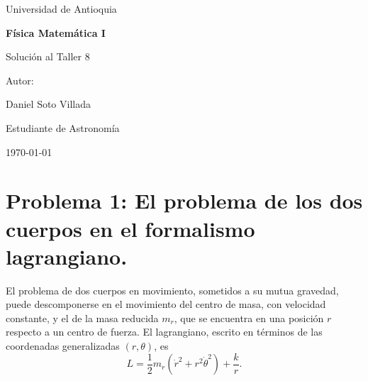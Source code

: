 \documentclass[a4paper]{article}
\begin{document}
\begin{titlepage}
  \centering
  {\Large Universidad de Antioquia\par}
  \vspace{2cm}
  {\huge\bfseries Física Matemática I\par}
  \vspace{0.4cm}
  {\Large Solución al Taller 8 \par}
  \vspace{2.5cm}
  {\large Autor:\par}
  \vspace{0.2cm}
  {\large Daniel Soto Villada\par}
  {\large Estudiante de Astronomía\par}
  \vfill
  {\large \today\par}
\end{titlepage}

\newpage
\tableofcontents
\newpage


\section{Problema 1: El problema de los dos cuerpos en el formalismo lagrangiano.}

El problema de dos cuerpos en movimiento, sometidos a su mutua gravedad, puede descomponerse en el movimiento del centro de masa, con velocidad constante, y el de la masa reducida $m_r$, que se encuentra en una posición $r$ respecto a un centro de fuerza. El lagrangiano, escrito en términos de las coordenadas generalizadas $(r, \theta)$, es
$$L = \frac{1}{2}m_r \left(\dot{r}^2 + r^2\dot{\theta}^2\right) + \frac{k}{r}.$$
\end{document}
